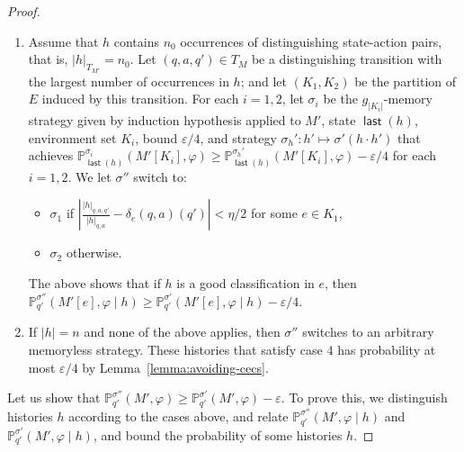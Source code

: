 \documentclass[a4paper,USenglish,cleveref, autoref, thm-restate]{lipics-v2021}
\let\epsilon\varepsilon
\def\abs#1{\ensuremath{\lvert #1 \rvert}}
\newcommand*{\pr}{\mathbb{P}}
\newcommand{\last}{\operatorname{\mathsf{last}}}
\begin{document}
\begin{proof}
\begin{enumerate}
    \item Assume that $h$ contains $n_0$ occurrences of distinguishing state-action pairs, that is, $\abs{h}_{T_{M'}} = n_0$.
    Let $(q,a,q') \in T_M$ be a distinguishing transition with the largest number of occurrences in $h$; and let $(K_1,K_2)$ be the partition of $E$ induced by this transition.
    For each $i=1,2$, let $\sigma_i$ be the $g_{\abs{K_i}}$-memory strategy given by induction hypothesis applied to $M'$, state $\last(h)$, environment set $K_i$,
    bound $\epsilon/4$, and strategy $\sigma_h' : h' \mapsto \sigma'(h \cdot h')$ that achieves 
    $\pr_{\last(h)}^{\sigma_i}(M'[K_i],\varphi)\geq \pr_{\last(h)}^{\sigma_h'}(M'[K_i],\varphi) - \epsilon/4$ for each $i=1,2$.
    We let $\sigma''$ switch to:
    \begin{itemize}
      \item $\sigma_1$ if $\left\lvert\frac{\abs{h}_{q,a,q'}}{\abs{h}_{q,a}} - \delta_{e}(q,a)(q')\right\rvert < \eta/2$ for some $e \in K_1$,
      \item $\sigma_2$ otherwise.
    \end{itemize}
    
    The above shows that if $h$ is a good classification in $e$, then 
    $\pr_{q'}^{\sigma''}(M'[e],\varphi \mid h ) \geq \pr_{q'}^{\sigma'}(M'[e],\varphi \mid h) - \epsilon/4$.

  
    \item If $\abs{h} = n$ and none of the above applies, then $\sigma''$ switches to an arbitrary memoryless strategy.
    These histories that satisfy case 4 has probability at most $\epsilon/4$ by Lemma~\ref{lemma:avoiding-cecs}.
  \end{enumerate}
  
  \medskip
  Let us show that $\pr_{q'}^{\sigma''}(M',\varphi) \geq \pr_{q'}^{\sigma'}(M',\varphi) - \epsilon$.  
  To prove this, we distinguish histories $h$ according to the cases above, 
  and relate $\pr_{q'}^{\sigma''}(M',\varphi \mid h )$ and $\pr_{q'}^{\sigma'}(M',\varphi\mid h)$,
  and bound the probability of some histories $h$.
  

\end{proof}
\end{document}

